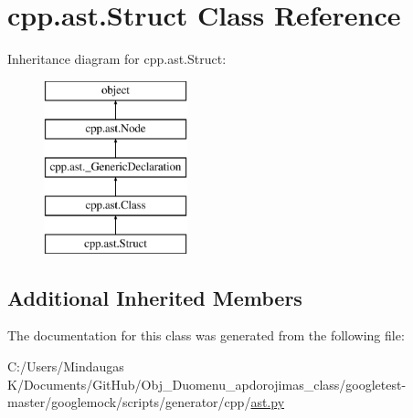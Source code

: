 \hypertarget{classcpp_1_1ast_1_1_struct}{}\section{cpp.\+ast.\+Struct Class Reference}
\label{classcpp_1_1ast_1_1_struct}
Inheritance diagram for cpp.\+ast.\+Struct\+:\begin{figure}[H]
\begin{center}
\leavevmode
\includegraphics[height=5.000000cm]{da/d2a/classcpp_1_1ast_1_1_struct}
\end{center}
\end{figure}
\subsection*{Additional Inherited Members}


The documentation for this class was generated from the following file\+:\begin{DoxyCompactItemize}
\item 
C\+:/\+Users/\+Mindaugas K/\+Documents/\+Git\+Hub/\+Obj\+\_\+\+Duomenu\+\_\+apdorojimas\+\_\+class/googletest-\/master/googlemock/scripts/generator/cpp/\mbox{\hyperlink{googletest-master_2googlemock_2scripts_2generator_2cpp_2ast_8py}{ast.\+py}}\end{DoxyCompactItemize}
